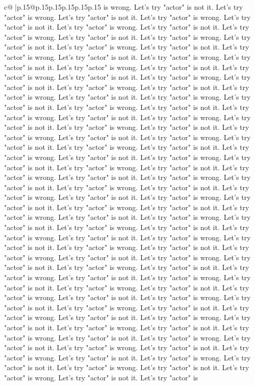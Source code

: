 \documentclass{article}
\begin{document}
{\begin{supertabular}{c@{$\;$}|p{.15\linewidth}@{}p{.15\linewidth}p{.15\linewidth}p{.15\linewidth}p{.15\linewidth}p{.15\linewidth}}
{{{is wrong. Let's try "actor" is not it. Let's try "actor" is wrong. Let's try "actor" is not it. Let's try "actor" is wrong. Let's try "actor" is not it. Let's try "actor" is wrong. Let's try "actor" is not it. Let's try "actor" is wrong. Let's try "actor" is not it. Let's try "actor" is wrong. Let's try "actor" is not it. Let's try "actor" is wrong. Let's try "actor" is not it. Let's try "actor" is wrong. Let's try "actor" is not it. Let's try "actor" is wrong. Let's try "actor" is not it. Let's try "actor" is wrong. Let's try "actor" is not it. Let's try "actor" is wrong. Let's try "actor" is not it. Let's try "actor" is wrong. Let's try "actor" is not it. Let's try "actor" is wrong. Let's try "actor" is not it. Let's try "actor" is wrong. Let's try "actor" is not it. Let's try "actor" is wrong. Let's try "actor" is not it. Let's try "actor" is wrong. Let's try "actor" is not it. Let's try "actor" is wrong. Let's try "actor" is not it. Let's try "actor" is wrong. Let's try "actor" is not it. Let's try "actor" is wrong. Let's try "actor" is not it. Let's try "actor" is wrong. Let's try "actor" is not it. Let's try "actor" is wrong. Let's try "actor" is not it. Let's try "actor" is wrong. Let's try "actor" is not it. Let's try "actor" is wrong. Let's try "actor" is not it. Let's try "actor" is wrong. Let's try "actor" is not it. Let's try "actor" is wrong. Let's try "actor" is not it. Let's try "actor" is wrong. Let's try "actor" is not it. Let's try "actor" is wrong. Let's try "actor" is not it. Let's try "actor" is wrong. Let's try "actor" is not it. Let's try "actor" is wrong. Let's try "actor" is not it. Let's try "actor" is wrong. Let's try "actor" is not it. Let's try "actor" is wrong. Let's try "actor" is not it. Let's try "actor" is wrong. Let's try "actor" is not it. Let's try "actor" is wrong. Let's try "actor" is not it. Let's try "actor" is wrong. Let's try "actor" is not it. Let's try "actor" is wrong. Let's try "actor" is not it. Let's try "actor" is wrong. Let's try "actor" is not it. Let's try "actor" is wrong. Let's try "actor" is not it. Let's try "actor" is wrong. Let's try "actor" is not it. Let's try "actor" is wrong. Let's try "actor" is not it. Let's try "actor" is wrong. Let's try "actor" is not it. Let's try "actor" is wrong. Let's try "actor" is not it. Let's try "actor" is wrong. Let's try "actor" is not it. Let's try "actor" is wrong. Let's try "actor" is not it. Let's try "actor" is wrong. Let's try "actor" is not it. Let's try "actor" is wrong. Let's try "actor" is not it. Let's try "actor" is wrong. Let's try "actor" is not it. Let's try "actor" is wrong. Let's try "actor" is not it. Let's try "actor" is wrong. Let's try "actor" is not it. Let's try "actor" is wrong. Let's try "actor" is not it. Let's try "actor" is wrong. Let's try "actor" is not it. Let's try "actor" is wrong. Let's try "actor" is not it. Let's try "actor" is wrong. Let's try "actor" is not it. Let's try "actor" is wrong. Let's try "actor" is not it. Let's try "actor" is wrong. Let's try "actor" is not it. Let's try "actor" is wrong. Let's try "actor" is not it. Let's try "actor" is wrong. Let's try "actor" is not it. Let's try "actor" is }}}
\end{supertabular}}
\end{document}

